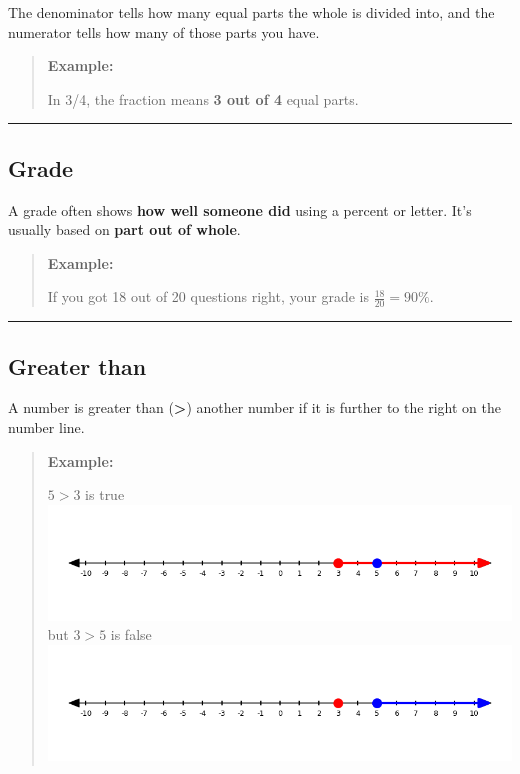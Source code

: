 \documentclass[
  letterpaper,
  DIV=11,
  numbers=noendperiod]{scrreprt}
\begin{document}
The denominator tells how many equal parts the whole is divided into,
and the numerator tells how many of those parts you have.

\begin{quote}
\textbf{Example:}

In 3/4, the fraction means \textbf{3 out of 4} equal parts.
\end{quote}

\begin{center}\rule{0.5\linewidth}{0.5pt}\end{center}

\subsection*{Grade}\label{glossary-grade}

A grade often shows \textbf{how well someone did} using a percent or
letter. It's usually based on \textbf{part out of whole}.

\begin{quote}
\textbf{Example:}

If you got 18 out of 20 questions right, your grade is
\(\frac{18}{20} = 90\%\).
\end{quote}

\begin{center}\rule{0.5\linewidth}{0.5pt}\end{center}

\subsection*{Greater than}\label{glossary-greater-than}

A number is greater than (\textbf{\textgreater{}}) another number if it
is further to the right on the number line.

\begin{quote}
\textbf{Example:}

\(5 > 3\) is true
\includegraphics[width=1\linewidth,height=\textheight,keepaspectratio]{images/Glossary/greater_than_true.png}
but \(3 > 5\) is false
\includegraphics[width=1\linewidth,height=\textheight,keepaspectratio]{images/Glossary/greater_than_false.png}
\end{quote}
\end{document}
